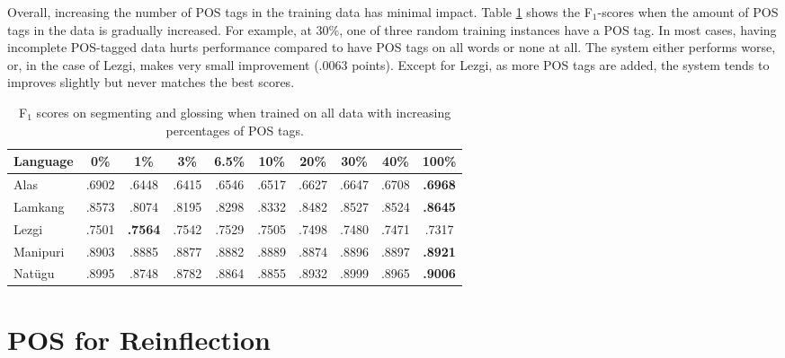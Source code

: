 Overall, increasing the number of POS tags in the training data has minimal impact. Table \ref{tab:POSSGpsp} shows the F$_1$-scores when the amount of POS tags in the data is gradually increased. For example, at 30\%, one of three random training instances have a POS tag. In most cases, having incomplete POS-tagged data hurts performance compared to have POS tags on all words or none at all. 
The system either performs worse, or, in the case of Lezgi, makes very small improvement (.0063 points). Except for Lezgi, as more POS tags are added, the system tends to improves slightly but never matches the best scores. 


\begin{table}[ht]
    \centering
    \begin{tabular}{l|ccccccccc}
       \textbf{Language} & \textbf{0\%} & \textbf{1\%} & \textbf{3\%} & \textbf{6.5\%} & \textbf{10\%} & \textbf{20\%} & \textbf{30\%} & \textbf{40\%} & \textbf{100\%}  \\
       \hline
       Alas  & .6902 & .6448  & .6415 & .6546 & .6517 & .6627 & .6647 & .6708 & \textbf{.6968} \\
       \hline
       Lamkang & .8573 & .8074 & .8195 & .8298 & .8332 & .8482 & .8527 & .8524 & \textbf{.8645}  \\
       \hline
       Lezgi  & .7501 & \textbf{.7564} & .7542 & .7529 & .7505 & .7498 & .7480  & .7471 & .7317 \\
       \hline
       Manipuri & .8903 & .8885 & .8877 & .8882 & .8889 & .8874 & .8896 & .8897 & \textbf{.8921} \\
       \hline
       Nat\"ugu & .8995 & .8748 & .8782 & .8864 & .8855 & .8932 & .8999 & .8965 & \textbf{.9006} \\
    \end{tabular}
    \caption{F$_1$ scores on segmenting and glossing when trained on all data with increasing percentages of POS tags.}
    \label{tab:POSSGpsp}
\end{table}



\section{POS for Reinflection}
\label{sec:inflection}

